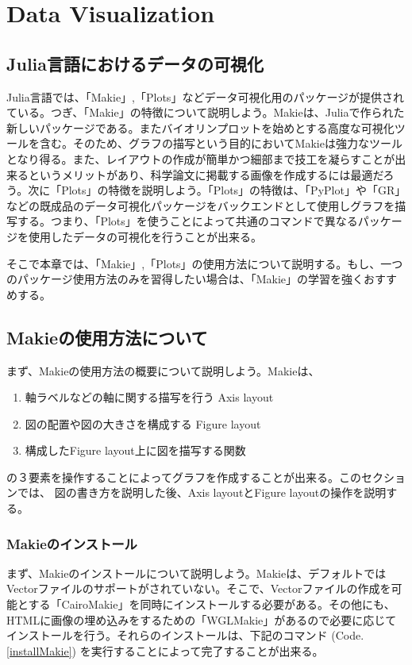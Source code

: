 \documentclass[11pt,dvipdfmx,b5paper,oneside]{jsbook}
\begin{document}
\chapter{Data Visualization}
\section{Julia言語におけるデータの可視化}

Julia言語では、「Makie」,「Plots」などデータ可視化用のパッケージが提供されている。つぎ、「Makie」の特徴について説明しよう。Makieは、Juliaで作られた新しいパッケージである。またバイオリンプロットを始めとする高度な可視化ツールを含む。そのため、グラフの描写という目的においてMakieは強力なツールとなり得る。また、レイアウトの作成が簡単かつ細部まで技工を凝らすことが出来るというメリットがあり、科学論文に掲載する画像を作成するには最適だろう。次に「Plots」の特徴を説明しよう。「Plots」の特徴は、「PyPlot」や「GR」などの既成品のデータ可視化パッケージをバックエンドとして使用しグラフを描写する。つまり、「Plots」を使うことによって共通のコマンドで異なるパッケージを使用したデータの可視化を行うことが出来る。

そこで本章では、「Makie」,「Plots」の使用方法について説明する。もし、一つのパッケージ使用方法のみを習得したい場合は、「Makie」の学習を強くおすすめする。
\newpage


\section{Makieの使用方法について}
まず、Makieの使用方法の概要について説明しよう。Makieは、
\begin{enumerate}
 \item 軸ラベルなどの軸に関する描写を行う Axis layout
 \item 図の配置や図の大きさを構成する Figure layout
 \item 構成したFigure layout上に図を描写する関数
\end{enumerate}
の３要素を操作することによってグラフを作成することが出来る。このセクションでは、
図の書き方を説明した後、Axis layoutとFigure layoutの操作を説明する。

\subsection{Makieのインストール}
まず、Makieのインストールについて説明しよう。Makieは、デフォルトではVectorファイルのサポートがされていない。そこで、Vectorファイルの作成を可能とする「CairoMakie」を同時にインストールする必要がある。その他にも、HTMLに画像の埋め込みをするための「WGLMakie」があるので必要に応じてインストールを行う。それらのインストールは、下記のコマンド (Code. \ref{installMakie}) を実行することによって完了することが出来る。
\end{document}
